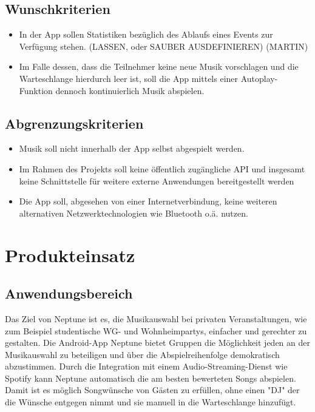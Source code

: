 \documentclass[oneside, ngerman]{sdqtechreport}
\begin{document}
\section{Wunschkriterien}
\label{sec:Zielbestimmungen:Wunschkriterien}
\begin{itemize}
    \item In der App sollen Statistiken bezüglich des Ablaufs eines Events zur Verfügung stehen. (LASSEN, oder SAUBER AUSDEFINIEREN) (MARTIN)
    \item Im Falle dessen, dass die Teilnehmer keine neue Musik vorschlagen und die Warteschlange hierdurch leer ist, soll die App mittels einer Autoplay-Funktion dennoch kontinuierlich Musik abspielen.

\end{itemize}

\section{Abgrenzungskriterien}
\label{sec:Zielbestimmungen:Abgrenzungskriterien}
\begin{itemize}
    \item Musik soll nicht innerhalb der App selbst abgespielt werden.
    \item Im Rahmen des Projekts soll keine öffentlich zugängliche API und insgesamt keine Schnittstelle für weitere externe Anwendungen bereitgestellt werden
    \item Die App soll, abgesehen von einer Internetverbindung, keine weiteren alternativen Netzwerktechnologien wie Bluetooth o.ä. nutzen.

\end{itemize}


\chapter{Produkteinsatz}
\label{chap:Produkteinsatz}

\section{Anwendungsbereich}
\label{sec:Produkteinsatz:Anwendungsbereich}
\textbf{}Das Ziel von Neptune ist es, die Musikauswahl bei privaten Veranstaltungen, wie zum Beispiel studentische WG- und Wohnheimpartys, einfacher und gerechter zu gestalten.
Die Android-App Neptune bietet Gruppen die Möglichkeit jeden an der Musikauswahl zu beteiligen und über die Abspielreihenfolge demokratisch abzustimmen. Durch die Integration mit einem Audio-Streaming-Dienst wie Spotify kann Neptune automatisch die am besten bewerteten Songs abspielen. Damit ist es möglich Songwünsche von Gästen zu erfüllen, ohne einen "DJ"  der die Wünsche entgegen nimmt und sie manuell in die Warteschlange hinzufügt.
\end{document}
